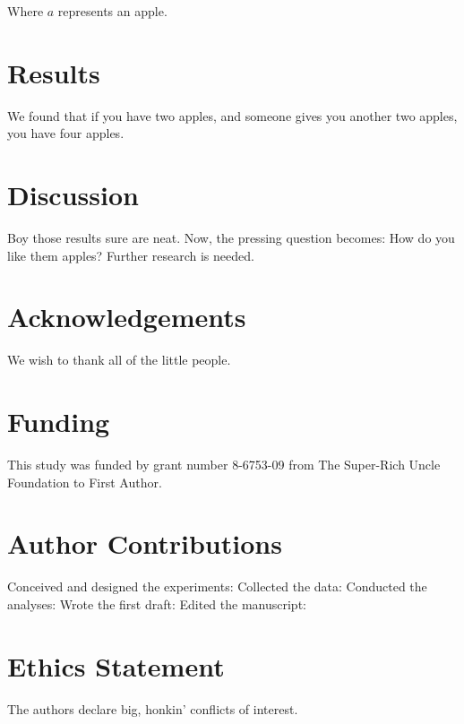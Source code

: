 \documentclass[11pt,letterpaper]{article} %
\begin{document}
Where $a$ represents an apple.

\section*{Results}
We found that if you have two apples, and someone gives you another two apples, you have four apples.

\section*{Discussion}
Boy those results sure are neat. Now, the pressing question becomes: How do you like them apples? Further research is needed.

\section*{Acknowledgements}
We wish to thank all of the little people.

\section*{Funding}
This study was funded by grant number 8-6753-09 from The Super-Rich Uncle Foundation to First Author.

\section*{Author Contributions}
Conceived and designed the experiments:
Collected the data:
Conducted the analyses:
Wrote the first draft:
Edited the manuscript:

\section*{Ethics Statement}
The authors declare big, honkin' conflicts of interest.

\end{document}
